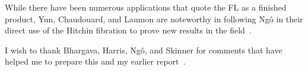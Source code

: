 \documentclass[brochure,english,12pt]{bourbaki}
\begin{document}

While there have been numerous applications that quote the FL as a
finished product, Yun, Chaudouard, and Laumon are noteworthy in
following Ng\^o in their direct use of the Hitchin fibration to prove
new results in the field~\cite{Yun:2009}.


I wish to thank Bhargava, Harris, Ng\^o, and Skinner for comments that
have helped me to prepare this and my earlier report~\cite{thales:NBC:2011}.
 

\raggedright

\end{document}
